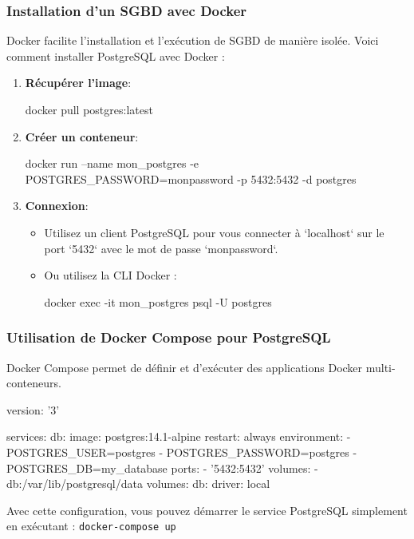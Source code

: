 \begin{frame}[fragile]
  \frametitle{Installation d'un SGBD avec Docker}

  Docker facilite l'installation et l'exécution de SGBD de manière isolée. Voici comment installer PostgreSQL avec Docker :

  \begin{enumerate}
      \item \textbf{Récupérer l'image}:
      \begin{semiverbatim}
docker pull postgres:latest
      \end{semiverbatim}

      \item \textbf{Créer un conteneur}:
      \begin{semiverbatim}
docker run --name mon_postgres
  -e POSTGRES_PASSWORD=monpassword
  -p 5432:5432 -d postgres
      \end{semiverbatim}

      \item \textbf{Connexion}:
      \begin{itemize}
          \item Utilisez un client PostgreSQL pour vous connecter à `localhost` sur le port `5432` avec le mot de passe `monpassword`.
          \item Ou utilisez la CLI Docker :
          \begin{semiverbatim}
docker exec -it mon_postgres psql -U postgres
          \end{semiverbatim}
      \end{itemize}
  \end{enumerate}
\end{frame}

\begin{frame}[fragile]
  \frametitle{Utilisation de Docker Compose pour PostgreSQL}

  Docker Compose permet de définir et d'exécuter des applications Docker multi-conteneurs.
  \scriptsize
  \begin{semiverbatim}
version: '3'

services:
  db:
    image: postgres:14.1-alpine
    restart: always
    environment:
      - POSTGRES_USER=postgres
      - POSTGRES_PASSWORD=postgres
      - POSTGRES_DB=my_database
    ports:
      - '5432:5432'
    volumes:
      - db:/var/lib/postgresql/data
volumes:
  db:
    driver: local
  \end{semiverbatim}
  \normalsize
  Avec cette configuration, vous pouvez démarrer le service PostgreSQL simplement en exécutant : \texttt{docker-compose up}

\end{frame}
